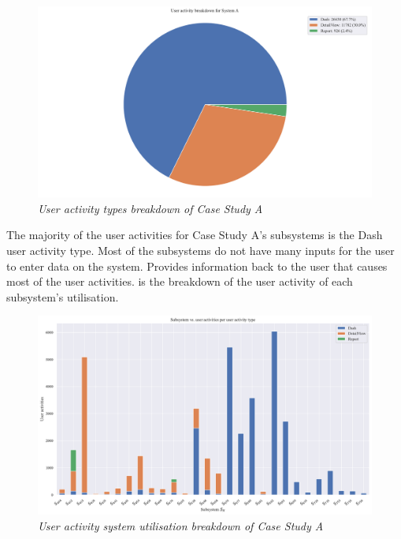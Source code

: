 \begin{figure}[!htb]
	\centering %
	\includegraphics[width=0.95\linewidth]{img/ch3/analysis/case_A_breakdown.pdf}
	\caption[User activity types breakdown of Case Study A]
	{\textit{User activity types breakdown of Case Study A}}\label{fig:ch3_caseABreakdown}
\end{figure} 

The  majority of the user activities for Case Study A's subsystems is the Dash user activity type. Most of the subsystems do not have many inputs for the user to enter data on the system. Provides information back to the user that causes most of the user activities.  is the breakdown of the user activity of each subsystem's utilisation.

\begin{figure}[!htb]
	\centering %
	\includegraphics[width=0.95\linewidth]{img/ch3/analysis/case_A_subsystems_1.pdf}
	\caption[User activity system utilisation breakdown of Case Study A]
	{\textit{User activity system utilisation breakdown of Case Study A}}\label{fig:ch3_caseAAnalysis}
\end{figure}

